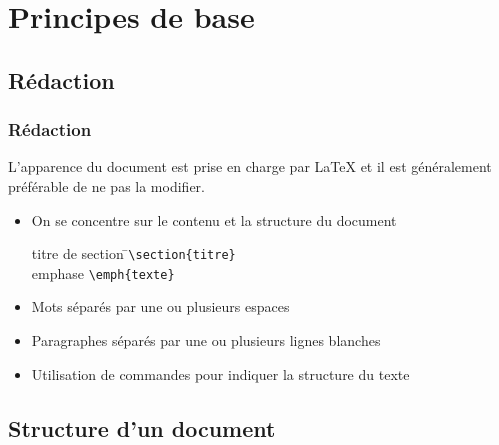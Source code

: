 \section{Principes de base}

\subsection{Rédaction}

\begin{frame}[fragile=singleslide]
  \frametitle{Rédaction}

  L'apparence du document est prise en charge par {\LaTeX} et
  il est généralement préférable de ne pas la modifier.

  \begin{itemize}
  \item On se concentre sur le \alert{contenu} et la \alert{structure} du
    document
      \bigskip
      \begin{tabbing}
        titre de section \qquad\= \faArrowRight \qquad\= \verb|\section{titre}| \\[6pt]
        emphase \> \faArrowRight \> \verb|\emph{texte}|
      \end{tabbing}
      \bigskip
  \item Mots séparés par une ou plusieurs \alert{espaces}
  \item Paragraphes séparés par une ou plusieurs \alert{lignes blanches}
  \item Utilisation de \alert{commandes} pour indiquer la structure du texte
  \end{itemize}
\end{frame}

\subsection{Structure d'un document}

